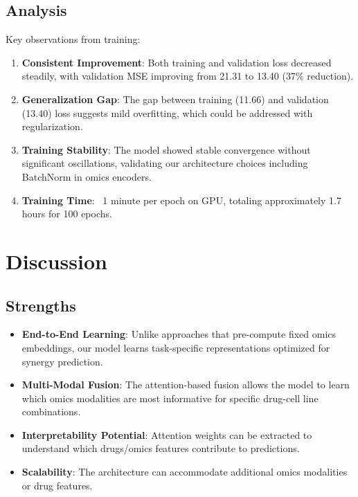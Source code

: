 \documentclass[10pt,twocolumn]{article}
\begin{document}
\subsection{Analysis}

Key observations from training:

\begin{enumerate}
    \item \textbf{Consistent Improvement}: Both training and validation loss decreased steadily, with validation MSE improving from 21.31 to 13.40 (37\% reduction).
    
    \item \textbf{Generalization Gap}: The gap between training (11.66) and validation (13.40) loss suggests mild overfitting, which could be addressed with regularization.
    
    \item \textbf{Training Stability}: The model showed stable convergence without significant oscillations, validating our architecture choices including BatchNorm in omics encoders.
    
    \item \textbf{Training Time}: ~1 minute per epoch on GPU, totaling approximately 1.7 hours for 100 epochs.
\end{enumerate}

\section{Discussion}

\subsection{Strengths}

\begin{itemize}
    \item \textbf{End-to-End Learning}: Unlike approaches that pre-compute fixed omics embeddings, our model learns task-specific representations optimized for synergy prediction.
    
    \item \textbf{Multi-Modal Fusion}: The attention-based fusion allows the model to learn which omics modalities are most informative for specific drug-cell line combinations.
    
    \item \textbf{Interpretability Potential}: Attention weights can be extracted to understand which drugs/omics features contribute to predictions.
    
    \item \textbf{Scalability}: The architecture can accommodate additional omics modalities or drug features.
\end{itemize}
\end{document}
